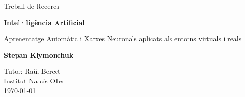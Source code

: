 \begin{titlepage}
	\begin{center}
		\vspace*{1cm}
		
		\Large
		Treball de Recerca
		
		\vspace{1.5cm}

		\Huge
		\textbf{Intel·ligència Artificial}

		\vspace{1cm}

		\LARGE
		Aprenentatge Automàtic i Xarxes Neuronals
		aplicats als entorns virtuals i reals

		\vspace{1.5cm}

		\textbf{Stepan Klymonchuk}

		\vfill
		\Large
		Tutor: Raül Bercet\\
		Institut Narcís Oller\\
		\today
	\end{center}
\end{titlepage}